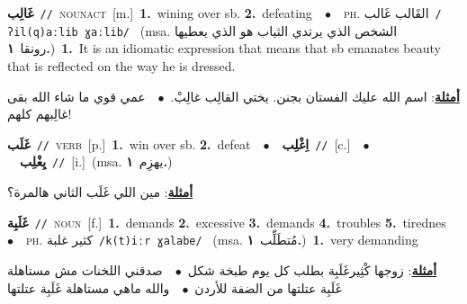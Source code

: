 \documentclass[10pt,a4paper,twoside]{article} %
\begin{document}
\begin{multicols}{2}
{\setlength\topsep{0pt}\textbf{\foreignlanguage{arabic}{غَالِب}}\ {\color{gray}\texttt{//}\color{black}}\ \textsc{noun\textunderscore act}\ [m.]\ \textbf{1.}~wining over sb.  \textbf{2.}~defeating\ \ $\bullet$\ \ \textsc{ph.} \color{gray} \foreignlanguage{arabic}{القَالب غَالب}\color{black}\ {\color{gray}\texttt{/{\sffamily ʔil(q)aːlib ɣaːlib}/}\color{black}}\ \color{gray} (msa. \foreignlanguage{arabic}{الشخص الذي يرتدي الثياب هو الذي يعطيها رونقا}~\foreignlanguage{arabic}{\textbf{١.}})\color{black}\ \textbf{1.}~It is an idiomatic expression that means that sb emanates beauty that is reflected on the way he is dressed.\  \begin{flushright}\color{gray}\foreignlanguage{arabic}{\textbf{\underline{\foreignlanguage{arabic}{أمثلة}}}: اسم الله عليك الفستان بجنن. يختي القالِب غالِبْ.\ $\bullet$\ \  عمي قوي ما شاء الله بقى غالِبهم كلهم!}\end{flushright}\color{black}} \vspace{2mm}

{\setlength\topsep{0pt}\textbf{\foreignlanguage{arabic}{غَلَب}}\ {\color{gray}\texttt{//}\color{black}}\ \textsc{verb}\ [p.]\ \textbf{1.}~win over sb.  \textbf{2.}~defeat\ \ $\bullet$\ \ \setlength\topsep{0pt}\textbf{\foreignlanguage{arabic}{اِغْلِب}}\ {\color{gray}\texttt{//}\color{black}}\ [c.]\ \ $\bullet$\ \ \setlength\topsep{0pt}\textbf{\foreignlanguage{arabic}{يِغْلِب}}\ {\color{gray}\texttt{//}\color{black}}\ [i.]\ \color{gray}(msa. \foreignlanguage{arabic}{يهزِم}~\foreignlanguage{arabic}{\textbf{١.}})\color{black}\  \begin{flushright}\color{gray}\foreignlanguage{arabic}{\textbf{\underline{\foreignlanguage{arabic}{أمثلة}}}: مين اللي غَلَب الثاني هالمرة؟}\end{flushright}\color{black}} \vspace{2mm}

{\setlength\topsep{0pt}\textbf{\foreignlanguage{arabic}{غَلَبِة}}\ {\color{gray}\texttt{//}\color{black}}\ \textsc{noun}\ [f.]\ \textbf{1.}~demands  \textbf{2.}~excessive  \textbf{3.}~demands  \textbf{4.}~troubles  \textbf{5.}~tirednes\ \ $\bullet$\ \ \textsc{ph.} \color{gray} \foreignlanguage{arabic}{كثير غلبة}\color{black}\ {\color{gray}\texttt{/{\sffamily k(t)iːr ɣalabe}/}\color{black}}\ \color{gray} (msa. \foreignlanguage{arabic}{مُتطَلِّب}~\foreignlanguage{arabic}{\textbf{١.}})\color{black}\ \textbf{1.}~very demanding\  \begin{flushright}\color{gray}\foreignlanguage{arabic}{\textbf{\underline{\foreignlanguage{arabic}{أمثلة}}}: زوجها كْثِيرغَلَبِة بطلب كل يوم طبخة شكل\ $\bullet$\ \  صدقني اللخنات مش مستاهلة غَلَبِة عتلتها من الضفة للأردن\ $\bullet$\ \  والله ماهي مستاهلة غَلَبِة عتلتها}\end{flushright}\color{black}} \vspace{2mm}


\end{multicols}
\end{document}
